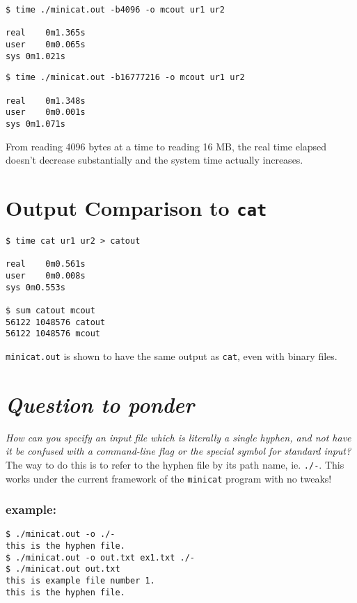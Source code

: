 \documentclass[10pt,a4paper]{article}
\begin{document}
\begin{verbatim}
$ time ./minicat.out -b4096 -o mcout ur1 ur2

real	0m1.365s
user	0m0.065s
sys	0m1.021s
\end{verbatim}

\begin{verbatim}
$ time ./minicat.out -b16777216 -o mcout ur1 ur2

real	0m1.348s
user	0m0.001s
sys	0m1.071s
\end{verbatim}

From reading 4096 bytes at a time to reading 16 MB, the real time elapsed doesn't decrease substantially and the system time actually increases.

\section*{Output Comparison to \texttt{cat}}

\begin{verbatim}
$ time cat ur1 ur2 > catout

real	0m0.561s
user	0m0.008s
sys	0m0.553s

$ sum catout mcout
56122 1048576 catout
56122 1048576 mcout
\end{verbatim}

\verb|minicat.out| is shown to have the same output as \verb|cat|, even with binary files.


\section*{\textit{Question to ponder}}
\textit{How can you specify an input file which is literally a single hyphen, and not have it be confused with a command-line flag or the special symbol for standard input?} \\

The way to do this is to refer to the hyphen file by its path name, ie. \verb|./-|. This works under the current framework of the \verb|minicat| program with no tweaks!

\subsubsection*{example:}
\begin{verbatim}
$ ./minicat.out -o ./- 
this is the hyphen file.
$ ./minicat.out -o out.txt ex1.txt ./-
$ ./minicat.out out.txt
this is example file number 1.
this is the hyphen file.
\end{verbatim}
\end{document}
